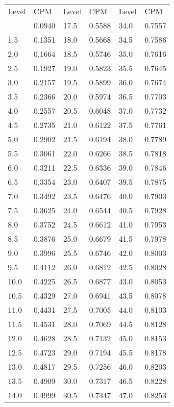 \begin{table}
\begin{center}
\begin{tabular}{l l l l l l}
Level & CPM & Level & CPM & Level & CPM \\
\Midrule
1.0 & 0.0940 & 17.5 & 0.5588 & 34.0 & 0.7557 \\ 
1.5 & 0.1351 & 18.0 & 0.5668 & 34.5 & 0.7586 \\
2.0 & 0.1664 & 18.5 & 0.5746 & 35.0 & 0.7616 \\
2.5 & 0.1927 & 19.0 & 0.5823 & 35.5 & 0.7645 \\
3.0 & 0.2157 & 19.5 & 0.5899 & 36.0 & 0.7674 \\
3.5 & 0.2366 & 20.0 & 0.5974 & 36.5 & 0.7703 \\
4.0 & 0.2557 & 20.5 & 0.6048 & 37.0 & 0.7732 \\
4.5 & 0.2735 & 21.0 & 0.6122 & 37.5 & 0.7761 \\
5.0 & 0.2902 & 21.5 & 0.6194 & 38.0 & 0.7789 \\
5.5 & 0.3061 & 22.0 & 0.6266 & 38.5 & 0.7818 \\
6.0 & 0.3211 & 22.5 & 0.6336 & 39.0 & 0.7846 \\
6.5 & 0.3354 & 23.0 & 0.6407 & 39.5 & 0.7875 \\
7.0 & 0.3492 & 23.5 & 0.6476 & 40.0 & 0.7903 \\
7.5 & 0.3625 & 24.0 & 0.6544 & 40.5 & 0.7928 \\
8.0 & 0.3752 & 24.5 & 0.6612 & 41.0 & 0.7953 \\
8.5 & 0.3876 & 25.0 & 0.6679 & 41.5 & 0.7978 \\
9.0 & 0.3996 & 25.5 & 0.6746 & 42.0 & 0.8003 \\
9.5 & 0.4112 & 26.0 & 0.6812 & 42.5 & 0.8028 \\
10.0 & 0.4225 & 26.5 & 0.6877 & 43.0 & 0.8053 \\
10.5 & 0.4329 & 27.0 & 0.6941 & 43.5 & 0.8078 \\
11.0 & 0.4431 & 27.5 & 0.7005 & 44.0 & 0.8103 \\
11.5 & 0.4531 & 28.0 & 0.7069 & 44.5 & 0.8128 \\
12.0 & 0.4628 & 28.5 & 0.7132 & 45.0 & 0.8153 \\
12.5 & 0.4723 & 29.0 & 0.7194 & 45.5 & 0.8178 \\
13.0 & 0.4817 & 29.5 & 0.7256 & 46.0 & 0.8203 \\
13.5 & 0.4909 & 30.0 & 0.7317 & 46.5 & 0.8228 \\
14.0 & 0.4999 & 30.5 & 0.7347 & 47.0 & 0.8253 \\

\end{tabular}
\end{center}
\end{table}
